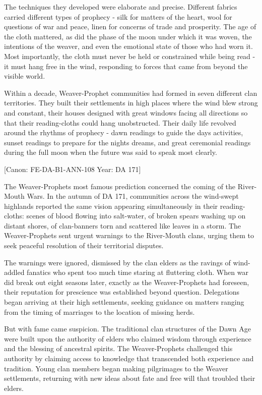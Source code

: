 The techniques they developed were elaborate and precise. Different
fabrics carried different types of prophecy - silk for matters of the
heart, wool for questions of war and peace, linen for concerns of trade
and prosperity. The age of the cloth mattered, as did the phase of the
moon under which it was woven, the intentions of the weaver, and even
the emotional state of those who had worn it. Most importantly, the
cloth must never be held or constrained while being read - it must hang
free in the wind, responding to forces that came from beyond the visible
world.

Within a decade, Weaver-Prophet communities had formed in seven
different clan territories. They built their settlements in high places
where the wind blew strong and constant, their houses designed with
great windows facing all directions so that their reading-cloths could
hang unobstructed. Their daily life revolved around the rhythms of
prophecy - dawn readings to guide the day\textquotesingle s activities,
sunset readings to prepare for the night\textquotesingle s dreams, and
great ceremonial readings during the full moon when the future was said
to speak most clearly.

{[}Canon: FE-DA-B1-ANN-108 \textbar{} Year: DA 171{]}

The Weaver-Prophets\textquotesingle{} most famous prediction concerned
the coming of the River-Mouth Wars. In the autumn of DA 171, communities
across the wind-swept highlands reported the same vision appearing
simultaneously in their reading-cloths: scenes of blood flowing into
salt-water, of broken spears washing up on distant shores, of
clan-banners torn and scattered like leaves in a storm. The
Weaver-Prophets sent urgent warnings to the River-Mouth clans, urging
them to seek peaceful resolution of their territorial disputes.

The warnings were ignored, dismissed by the clan elders as the ravings
of wind-addled fanatics who spent too much time staring at fluttering
cloth. When war did break out eight seasons later, exactly as the
Weaver-Prophets had foreseen, their reputation for prescience was
established beyond question. Delegations began arriving at their high
settlements, seeking guidance on matters ranging from the timing of
marriages to the location of missing herds.

But with fame came suspicion. The traditional clan structures of the
Dawn Age were built upon the authority of elders who claimed wisdom
through experience and the blessing of ancestral spirits. The
Weaver-Prophets challenged this authority by claiming access to
knowledge that transcended both experience and tradition. Young clan
members began making pilgrimages to the Weaver settlements, returning
with new ideas about fate and free will that troubled their elders.

